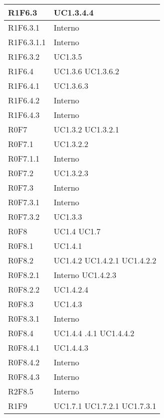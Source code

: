 \begin{center}
\begin{longtable}{| p{4cm} | p{4cm} |}
		\hline
		R1F6.3  &  UC1.3.4.4 \\
		\hline
		R1F6.3.1  &  Interno \\
		\hline
		R1F6.3.1.1  &  Interno \\
		\hline
		R1F6.3.2  &  UC1.3.5 \\
		\hline
		R1F6.4  &  UC1.3.6 \newline UC1.3.6.2 \\
		\hline
		R1F6.4.1  &  UC1.3.6.3 \\
		\hline
		R1F6.4.2  &  Interno \\
		\hline
		R1F6.4.3  &  Interno \\
		\hline
		R0F7  &  UC1.3.2 \newline UC1.3.2.1 \\
		\hline
		R0F7.1  &  UC1.3.2.2 \\
		\hline
		R0F7.1.1  &  Interno \\
		\hline
		R0F7.2  &  UC1.3.2.3 \\
		\hline
		R0F7.3  &  Interno \\
		\hline
		R0F7.3.1  &  Interno \\
		\hline
		R0F7.3.2  &  UC1.3.3 \\
		\hline
		R0F8  &  UC1.4 \newline UC1.7 \\
		\hline
		R0F8.1  &  UC1.4.1 \\
		\hline
		R0F8.2  &  UC1.4.2 \newline UC1.4.2.1 \newline UC1.4.2.2 \\
		\hline
		R0F8.2.1  &  Interno \newline UC1.4.2.3 \\
		\hline
		R0F8.2.2  &  UC1.4.2.4 \\
		\hline
		R0F8.3  &  UC1.4.3 \\
		\hline
		R0F8.3.1  &  Interno \\
		\hline
		R0F8.4  &  UC1.4.4 \newline 1.4.4.1 \newline UC1.4.4.2 \\
		\hline
		R0F8.4.1  &  UC1.4.4.3 \\
		\hline
		R0F8.4.2  &  Interno \\
		\hline
		R0F8.4.3  &  Interno \\
		\hline
		R2F8.5	&	Interno\\
		\hline
		R1F9  &  UC1.7.1 \newline UC1.7.2.1 \newline UC1.7.3.1 \\

\end{longtable}
\end{center}
